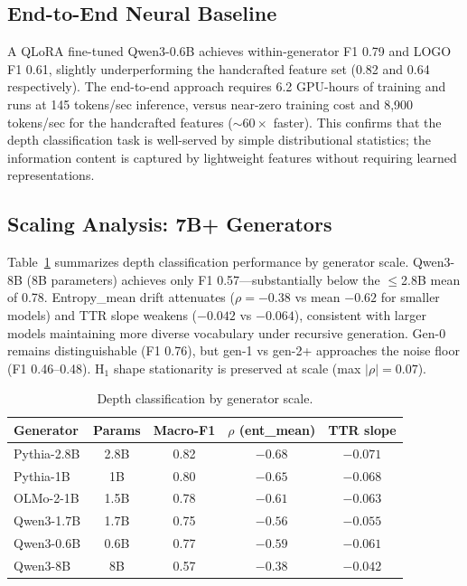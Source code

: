 \documentclass[letterpaper]{article}
\begin{document}
\subsection{End-to-End Neural Baseline}
\label{sec:e2e}

A QLoRA fine-tuned Qwen3-0.6B achieves within-generator F1 0.79 and LOGO F1 0.61, slightly underperforming the handcrafted feature set (0.82 and 0.64 respectively).
The end-to-end approach requires 6.2 GPU-hours of training and runs at 145 tokens/sec inference, versus near-zero training cost and 8{,}900 tokens/sec for the handcrafted features (${\sim}60\times$ faster).
This confirms that the depth classification task is well-served by simple distributional statistics; the information content is captured by lightweight features without requiring learned representations.

\subsection{Scaling Analysis: 7B+ Generators}
\label{sec:scale}

Table~\ref{tab:scale} summarizes depth classification performance by generator scale.
Qwen3-8B (8B parameters) achieves only F1 0.57---substantially below the ${\leq}$2.8B mean of 0.78.
Entropy\_mean drift attenuates ($\rho{=}-0.38$ vs mean $-0.62$ for smaller models) and TTR slope weakens ($-0.042$ vs $-0.064$), consistent with larger models maintaining more diverse vocabulary under recursive generation.
Gen-0 remains distinguishable (F1 0.76), but gen-1 vs gen-2+ approaches the noise floor (F1 0.46--0.48).
H$_1$ shape stationarity is preserved at scale (max $|\rho|{=}0.07$).

\begin{table}[h]
\centering
\caption{Depth classification by generator scale.}
\label{tab:scale}
\begin{tabular}{lcccc}
\toprule
Generator & Params & Macro-F1 & $\rho$ (ent\_mean) & TTR slope \\
\midrule
Pythia-2.8B & 2.8B & 0.82 & $-0.68$ & $-0.071$ \\
Pythia-1B & 1B & 0.80 & $-0.65$ & $-0.068$ \\
OLMo-2-1B & 1.5B & 0.78 & $-0.61$ & $-0.063$ \\
Qwen3-1.7B & 1.7B & 0.75 & $-0.56$ & $-0.055$ \\
Qwen3-0.6B & 0.6B & 0.77 & $-0.59$ & $-0.061$ \\
\midrule
Qwen3-8B & 8B & 0.57 & $-0.38$ & $-0.042$ \\
\bottomrule
\end{tabular}
\end{table}
\end{document}
